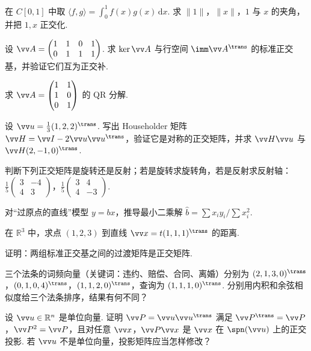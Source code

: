 {\begin{exA}
			\item\label{ex:ip:A12} 在 $C[0,1]$ 中取 $\langle f,g\rangle=\int_0^1f(x)g(x)\,\mathrm dx$. 求 $\|1\|$，$\|x\|$，$1$ 与 $x$ 的夹角，并把 $1,x$ 正交化.
			\item\label{ex:ip:A13} 设 $\vv A=\begin{pmatrix}1&1&0&1\\0&1&1&1\end{pmatrix}$. 求 $\ker\vv A$ 与行空间 $\imm\vv A^\trans$ 的标准正交基，并验证它们互为正交补.
			\item\label{ex:ip:A14} 求 $\vv A=\begin{pmatrix}1&1\\1&0\\0&1\end{pmatrix}$ 的 QR 分解.
			\item\label{ex:ip:A15} 设 $\vv u=\frac13(1,2,2)^\trans$. 写出 Householder 矩阵 $\vv H=\vv I-2\vv u\vv u^\trans$，验证它是对称的正交矩阵，并求 $\vv H\vv u$ 与 $\vv H(2,-1,0)^\trans$.
			\item\label{ex:ip:A16} 判断下列正交矩阵是旋转还是反射；若是旋转求旋转角，若是反射求反射轴：$\frac15\begin{pmatrix}3&-4\\4&3\end{pmatrix}$，$\frac15\begin{pmatrix}3&4\\4&-3\end{pmatrix}$.
			\item\label{ex:ip:A17} 对“过原点的直线”模型 $y=bx$，推导最小二乘解 $\hat b=\sum x_iy_i\big/\sum x_i^2$.
			\item\label{ex:ip:A18} 在 $\mathbb{R}^3$ 中，求点 $(1,2,3)$ 到直线 $\vv x=t(1,1,1)^\trans$ 的距离.
			\item\label{ex:ip:A19} 证明：两组标准正交基之间的过渡矩阵是正交矩阵.
			\item\label{ex:ip:A20} 三个法条的词频向量（关键词：违约、赔偿、合同、离婚）分别为 $(2,1,3,0)^\trans$，$(0,1,0,4)^\trans$，$(1,1,2,0)^\trans$，查询为 $(1,1,1,0)^\trans$. 分别用内积和余弦相似度给三个法条排序，结果有何不同？
			\item\label{ex:ip:A21} 设 $\vv u\in\mathbb{R}^n$ 是单位向量. 证明 $\vv P=\vv u\vv u^\trans$ 满足 $\vv P^\trans=\vv P$，$\vv P^2=\vv P$，且对任意 $\vv x$，$\vv P\vv x$ 是 $\vv x$ 在 $\spn(\vv u)$ 上的正交投影. 若 $\vv u$ 不是单位向量，投影矩阵应当怎样修改？
		\end{exA}
		
}
